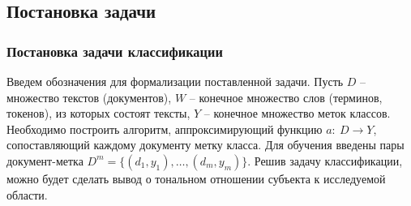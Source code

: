 \subsection{Постановка задачи}
\subsubsection{Постановка задачи классификации}
Введем обозначения для формализации поставленной задачи.
Пусть $D$ -- множество текстов (документов), $W$ -- конечное множество слов (терминов, токенов), из которых состоят тексты, $Y$ -- конечное множество меток классов. Необходимо построить алгоритм, аппроксимирующий функцию $a:\ D\to Y$, сопоставляющий каждому документу метку класса. Для обучения введены пары документ-метка $D^m = \{(d_1, y_1), \ldots, (d_m, y_m)\}$. Решив задачу классификации, можно будет сделать вывод о тональном отношении субъекта к исследуемой области.
